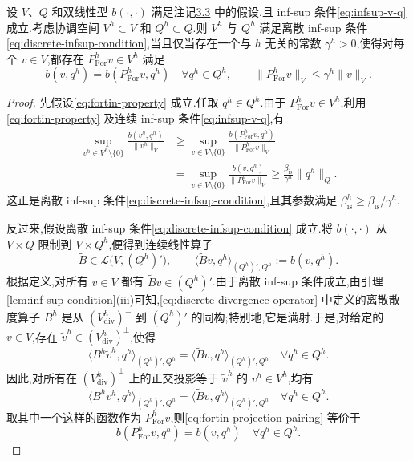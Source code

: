 \begin{lemma}\label{lem:fortin-criterion}
设 $V$、$Q$ 和双线性型 $b(\cdot,\cdot)$ 满足注记\hyperref[note:abstract-saddle-point-problem]{3.3} 中的假设,且 inf-sup 条件\cref{eq:infsup-v-q} 成立.考虑协调空间 $V^h\subset V$ 和 $Q^h\subset Q$.则 $V^h$ 与 $Q^h$ 满足离散 inf-sup 条件\cref{eq:discrete-infsup-condition},当且仅当存在一个与 $h$ 无关的常数 $\gamma^h>0$,使得对每个 $v\in V$,都存在 $P_{\mathrm{For}}^h v\in V^h$ 满足
\begin{equation}\label{eq:fortin-property}
  b(v,q^h)=b(P_{\mathrm{For}}^h v,q^h)
  \quad\forall q^h\in Q^h,
  \qquad
  \|P_{\mathrm{For}}^h v\|_V\le \gamma^h\|v\|_V.
\end{equation}
\end{lemma}

\begin{proof}
先假设\cref{eq:fortin-property} 成立.任取 $q^h\in Q^h$.由于 $P_{\mathrm{For}}^h v\in V^h$,利用\cref{eq:fortin-property} 及连续 inf-sup 条件\cref{eq:infsup-v-q},有
\[
\begin{aligned}
  \sup_{v^h\in V^h\setminus\{0\}}
    \frac{b(v^h,q^h)}{\|v^h\|_V}
  &\ge
  \sup_{v\in V\setminus\{0\}}
    \frac{b(P_{\mathrm{For}}^h v,q^h)}
         {\|P_{\mathrm{For}}^h v\|_V}\\
  &=\sup_{v\in V\setminus\{0\}}
    \frac{b(v,q^h)}{\|P_{\mathrm{For}}^h v\|_V}
  \ge \frac{\beta_{\mathrm{is}}}{\gamma^h}
       \|q^h\|_Q .
\end{aligned}
\]
这正是离散 inf-sup 条件\cref{eq:discrete-infsup-condition},且其参数满足 $\beta_{\mathrm{is}}^h\ge \beta_{\mathrm{is}}/\gamma^h$.

反过来,假设离散 inf-sup 条件\cref{eq:discrete-infsup-condition} 成立.将 $b(\cdot,\cdot)$ 从 $V\times Q$ 限制到 $V\times Q^h$,便得到连续线性算子
\[
  \widetilde B\in\mathcal{L}\bigl(V,(Q^h)'\bigr),
  \qquad
  \langle\widetilde Bv,q^h\rangle_{(Q^h)',Q^h}
  :=b(v,q^h).
\]
根据定义,对所有 $v\in V$ 都有 $\widetilde Bv\in(Q^h)'$.由于离散 inf-sup 条件成立,由引理\ref{lem:inf-sup-condition}(iii)可知,\cref{eq:discrete-divergence-operator} 中定义的离散散度算子 $B^h$ 是从 $(V_{\mathrm{div}}^h)^\perp$ 到 $(Q^h)'$ 的同构;特别地,它是满射.于是,对给定的 $v\in V$,存在 $\widetilde v^h\in(V_{\mathrm{div}}^h)^\perp$,使得
\[
  \langle B^h\widetilde v^h,q^h\rangle_{(Q^h)',Q^h}
  =\langle\widetilde Bv,q^h\rangle_{(Q^h)',Q^h}
  \quad\forall q^h\in Q^h.
\]
因此,对所有在 $(V_{\mathrm{div}}^h)^\perp$ 上的正交投影等于 $\widetilde v^h$ 的 $v^h\in V^h$,均有
\begin{equation}\label{eq:fortin-projection-pairing}
  \langle B^h v^h,q^h\rangle_{(Q^h)',Q^h}
  =\langle\widetilde Bv,q^h\rangle_{(Q^h)',Q^h}
  \quad\forall q^h\in Q^h.
\end{equation}
取其中一个这样的函数作为 $P_{\mathrm{For}}^h v$,则\cref{eq:fortin-projection-pairing} 等价于
\[
  b(P_{\mathrm{For}}^h v,q^h)=b(v,q^h)
  \quad\forall q^h\in Q^h.
\]


\end{proof}
